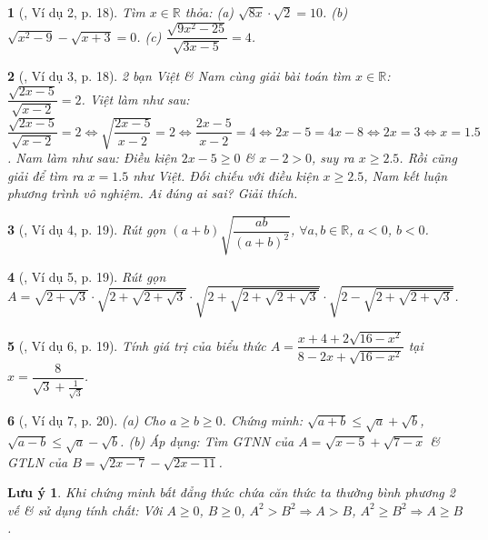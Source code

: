 \documentclass{article}
\newtheorem{baitoan}{}%
\newtheorem{luuy}{Lưu ý}
\begin{document}
\begin{baitoan}[\cite{Binh_boi_duong_Toan_9_tap_1}, Ví dụ 2, p. 18]
	Tìm $x\in\mathbb{R}$ thỏa: (a) $\sqrt{8x}\cdot\sqrt{2} = 10$. (b) $\sqrt{x^2 - 9} - \sqrt{x + 3} = 0$. (c) $\dfrac{\sqrt{9x^2 - 25}}{\sqrt{3x - 5}} = 4$.
\end{baitoan}

\begin{baitoan}[\cite{Binh_boi_duong_Toan_9_tap_1}, Ví dụ 3, p. 18]
	2 bạn Việt \& Nam cùng giải bài toán tìm $x\in\mathbb{R}$: $\dfrac{\sqrt{2x - 5}}{\sqrt{x - 2}} = 2$. Việt làm như sau: $\dfrac{\sqrt{2x - 5}}{\sqrt{x - 2}} = 2\Leftrightarrow\sqrt{\dfrac{2x - 5}{x - 2}} = 2\Leftrightarrow\dfrac{2x - 5}{x - 2} = 4\Leftrightarrow2x - 5 = 4x - 8\Leftrightarrow2x = 3\Leftrightarrow x = 1.5$. Nam làm như sau: Điều kiện $2x - 5\ge0$ \& $x - 2> 0$, suy ra $x\ge2.5$. Rồi cũng giải để tìm ra $x = 1.5$ như Việt. Đối chiếu với điều kiện $x\ge2.5$, Nam kết luận phương trình vô nghiệm. Ai đúng ai sai? Giải thích.
\end{baitoan}

\begin{baitoan}[\cite{Binh_boi_duong_Toan_9_tap_1}, Ví dụ 4, p. 19]
	Rút gọn $(a + b)\sqrt{\dfrac{ab}{(a + b)^2}}$, $\forall a,b\in\mathbb{R}$, $a < 0$, $b < 0$.
\end{baitoan}

\begin{baitoan}[\cite{Binh_boi_duong_Toan_9_tap_1}, Ví dụ 5, p. 19]
	Rút gọn $A = \sqrt{2 + \sqrt{3}}\cdot \sqrt{2 + \sqrt{2 + \sqrt{3}}}\cdot\sqrt{2 + \sqrt{2 + \sqrt{2 + \sqrt{3}}}}\cdot\sqrt{2 - \sqrt{2 + \sqrt{2 + \sqrt{3}}}}$.
\end{baitoan}

\begin{baitoan}[\cite{Binh_boi_duong_Toan_9_tap_1}, Ví dụ 6, p. 19]
	Tính giá trị của biểu thức $A = \dfrac{x + 4 + 2\sqrt{16 - x^2}}{8 - 2x + \sqrt{16 - x^2}}$ tại $x = \dfrac{8}{\sqrt{3} + \frac{1}{\sqrt{3}}}$.
\end{baitoan}

\begin{baitoan}[\cite{Binh_boi_duong_Toan_9_tap_1}, Ví dụ 7, p. 20]
	(a) Cho $a\ge b\ge0$. Chứng minh: $\sqrt{a + b}\le\sqrt{a} + \sqrt{b}$, $\sqrt{a - b}\le\sqrt{a} - \sqrt{b}$. (b) Áp dụng: Tìm {\rm GTNN} của $A = \sqrt{x - 5} + \sqrt{7 - x}$ \& {\rm GTLN} của $B = \sqrt{2x - 7} - \sqrt{2x - 11}$.
\end{baitoan}

\begin{luuy}
	Khi chứng minh bất đẳng thức chứa căn thức ta thường bình phương 2 vế \& sử dụng tính chất: Với $A\ge0$, $B\ge0$, $A^2 > B^2\Rightarrow A > B$, $A^2\ge B^2\Rightarrow A\ge B$.
\end{luuy}
\end{document}
